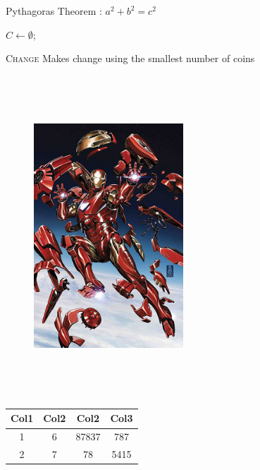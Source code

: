 \documentclass{IEEEtran}
\begin{document}
	
	
	\nocite{*}
	\vspace{2cm}
	Pythagoras Theorem : $a^2 + b^2 = c^2$
	\vspace{2cm}
	\begin{algorithm}
		$C \leftarrow \emptyset;$
		
		\caption{\textsc{Change} Makes change using the smallest number of coins}
	\end{algorithm}
	\vspace{2cm}
	\begin{figure}
		\includegraphics[width=0.5\textwidth,height=12cm]{IM.png}
	\end{figure}
	\begin{tabular}{||c c c c||} 
		\hline
		Col1 & Col2 & Col2 & Col3 \\ [0.5ex] 
		\hline\hline
		1 & 6 & 87837 & 787 \\ 
		\hline
		2 & 7 & 78 & 5415 \\
		\hline
	\end{tabular}
\end{document}
